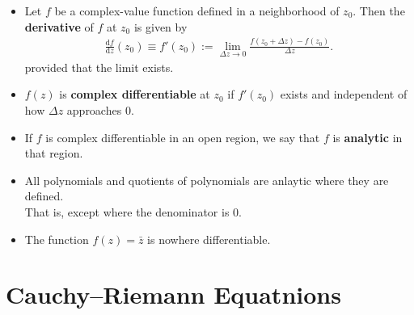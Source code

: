 \documentclass[10pt]{article}
\newcommand{\dee}{\mathrm{d}}
\newcommand{\ra}{\rightarrow}
\begin{document}
  \begin{itemize}
    \item Let $f$ be a complex-value function defined in a neighborhood of $z_0$. Then the {\bf derivative} of $f$ at $z_0$ is given by 
      \begin{align*}
        \frac{\dee f}{\dee z}(z_0) \equiv f'(z_0) := \lim_{\Delta z \ra 0} \frac{f(z_0 + \Delta z) - f(z_0)}{\Delta z}.
      \end{align*}
      provided that the limit exists.  

    \item $f(z)$ is {\bf complex differentiable} at $z_0$ if $f'(z_0)$ exists and independent of how $\Delta z$ approaches 0.    

    \item If $f$ is complex differentiable in an open region, we say that $f$ is {\bf analytic} in that region.

    \item All polynomials and quotients of polynomials are anlaytic where they are defined.\\
    That is, except where the denominator is 0.

    \item The function $f(z) = \bar{z}$ is nowhere differentiable.  
  \end{itemize}  

  \section{Cauchy--Riemann Equatnions} %
  \label{sec:cauchy_riemann_equatnions}
    
\end{document}
